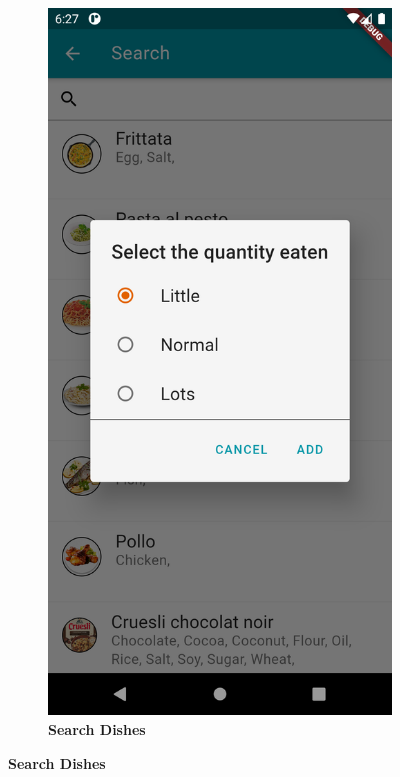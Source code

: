 \documentclass [12pt]{article}
\begin{document}
\begin{description}[leftmargin=1cm,rightmargin=1cm]
\begin{figure}[h!]
\begin{subfigure}[tr]{0.3\linewidth}
\includegraphics[width=\linewidth]{addDish5.PNG}
\caption{\textbf{Search Dishes}}
\end{subfigure}
\hspace*{\fill}

\end{figure}
\end{description}
\end{document}

